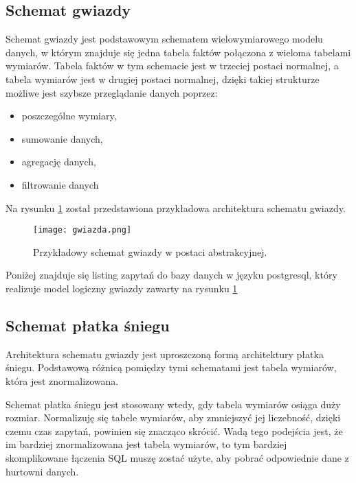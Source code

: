 \subsection{Schemat gwiazdy}
Schemat gwiazdy jest podstawowym schematem wielowymiarowego modelu danych,
 w którym znajduje się jedna tabela faktów połączona z wieloma tabelami wymiarów.
Tabela faktów w tym schemacie jest w trzeciej postaci normalnej, a tabela wymiarów jest w drugiej postaci normalnej,
dzięki takiej strukturze możliwe jest szybsze przeglądanie danych poprzez:
\begin{itemize}
 \item poszczególne wymiary,
 \item sumowanie danych,
 \item agregację danych,
 \item filtrowanie danych
\end{itemize}

Na rysunku  \ref{fig:gwiazda} został przedstawiona przykładowa architektura schematu gwiazdy.
\begin{center}
\begin{figure}[H]
  \begin{center}
    \texttt{[image: gwiazda.png]}
  \end{center}
  \caption{Przykładowy schemat gwiazdy w postaci abstrakcyjnej. }
    \label{fig:gwiazda}
\end{figure}
\end{center}
Poniżej znajduje się listing zapytań do bazy danych w języku postgresql,
 który realizuje model logiczny gwiazdy zawarty na rysunku \ref{fig:gwiazda}


\subsection{Schemat płatka śniegu}
Architektura schematu gwiazdy jest uproszczoną formą architektury płatka śniegu.
Podstawową różnicą pomiędzy tymi schematami jest tabela wymiarów, która jest znormalizowana.

Schemat płatka śniegu jest stosowany wtedy, gdy tabela wymiarów osiąga duży rozmiar.
Normalizuję się tabele wymiarów, aby zmniejszyć jej liczebność, dzięki czemu czas zapytań, 
powinien się znacząco skrócić. 
Wadą tego podejścia jest, że im bardziej znormalizowana jest tabela wymiarów,  
to tym bardziej skomplikowane łączenia SQL muszę zostać użyte, aby pobrać odpowiednie
dane z hurtowni danych. \cite{cube}

